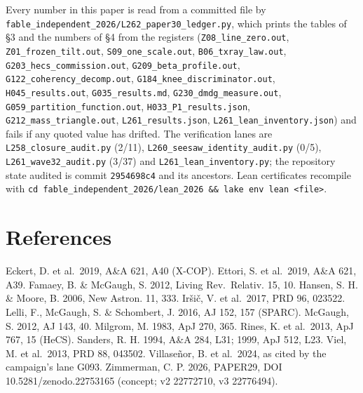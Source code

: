 \documentclass[
  11pt,
]{article}
\begin{document}
Every number in this paper is read from a committed file by
\texttt{fable\_independent\_2026/L262\_paper30\_ledger.py}, which prints
the tables of §3 and the numbers of §4 from the registers
(\texttt{Z08\_line\_zero.out}, \texttt{Z01\_frozen\_tilt.out},
\texttt{S09\_one\_scale.out}, \texttt{B06\_txray\_law.out},
\texttt{G203\_hecs\_commission.out}, \texttt{G209\_beta\_profile.out},
\texttt{G122\_coherency\_decomp.out},
\texttt{G184\_knee\_discriminator.out}, \texttt{H045\_results.out},
\texttt{G035\_results.md}, \texttt{G230\_dmdg\_measure.out},
\texttt{G059\_partition\_function.out}, \texttt{H033\_P1\_results.json},
\texttt{G212\_mass\_triangle.out}, \texttt{L261\_results.json},
\texttt{L261\_lean\_inventory.json}) and fails if any quoted value has
drifted. The verification lanes are \texttt{L258\_closure\_audit.py}
(2/11), \texttt{L260\_seesaw\_identity\_audit.py} (0/5),
\texttt{L261\_wave32\_audit.py} (3/37) and
\texttt{L261\_lean\_inventory.py}; the repository state audited is
commit \texttt{2954698c4} and its ancestors. Lean certificates recompile
with
\texttt{cd\ fable\_independent\_2026/lean\_2026\ \&\&\ lake\ env\ lean\ \textless{}file\textgreater{}}.

\section{References}\label{references}

Eckert, D. et al.~2019, A\&A 621, A40 (X-COP). Ettori, S. et al.~2019,
A\&A 621, A39. Famaey, B. \& McGaugh, S. 2012, Living Rev.~Relativ. 15,
10. Hansen, S. H. \& Moore, B. 2006, New Astron. 11, 333. Iršič, V. et
al.~2017, PRD 96, 023522. Lelli, F., McGaugh, S. \& Schombert, J. 2016,
AJ 152, 157 (SPARC). McGaugh, S. 2012, AJ 143, 40. Milgrom, M. 1983, ApJ
270, 365. Rines, K. et al.~2013, ApJ 767, 15 (HeCS). Sanders, R. H.
1994, A\&A 284, L31; 1999, ApJ 512, L23. Viel, M. et al.~2013, PRD 88,
043502. Villaseñor, B. et al.~2024, as cited by the campaign's lane
G093. Zimmerman, C. P. 2026, PAPER29, DOI 10.5281/zenodo.22753165
(concept; v2 22772710, v3 22776494).
\end{document}
